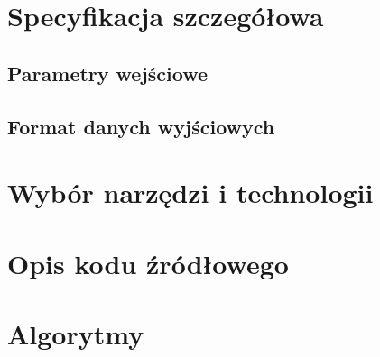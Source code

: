 \documentclass[11pt]{article}
\begin{document}
\section{Specyfikacja szczegółowa}
\subsection{Parametry wejściowe}
\subsection{Format danych wyjściowych}

\section{Wybór narzędzi i technologii}

\section{Opis kodu źródłowego}

\section{Algorytmy}
\end{document}
